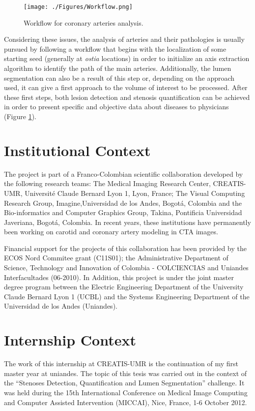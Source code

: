 \begin{figure}[htbp]
	\centering
		\texttt{[image: ./Figures/Workflow.png]}
	\caption[Workflow for coronary arteries analysis.]{Workflow for coronary arteries analysis.}
	\label{fig:Workflow}
\end{figure}

Considering these issues, the analysis of arteries and their pathologies is usually pursued by following a workflow that begins with the localization of some starting seed (generally at \textit{ostia} locations) in order to initialize an axis extraction algorithm to identify the path of the main arteries. Additionally, the lumen segmentation can also be a result of this step or, depending on the approach used, it can give a first approach to the volume of interest to be processed. After these first steps, both lesion detection and stenosis quantification can be achieved in order to present specific and objective data about diseases to physicians (Figure \ref{fig:Workflow}).


\section{Institutional Context}
%
The project is part of a Franco-Colombian scientific collaboration developed by the following research teams: The Medical Imaging Research Center, CREATIS-UMR, Universit\'{e} Claude Bernard Lyon 1, Lyon, France; The Visual Computing Research Group, Imagine,Universidad de los Andes, Bogot\'{a}, Colombia and the Bio-informatics and Computer Graphics Group, Takina, Pontificia Universidad Javeriana, Bogot\'{a}, Colombia. In recent years, these institutions have permanently been working on carotid and coronary artery modeling in CTA images.

Financial support for the projects of this collaboration has been provided by the ECOS Nord Commitee grant (C11S01); the Administrative Department of Science, Technology and Innovation of Colombia - COLCIENCIAS and Uniandes Interfacultades (06-2010). In Addition, this project is under the joint master degree program between the Electric Engineering Department of the University Claude Bernard Lyon 1 (UCBL) and the Systems Engineering Department of the Universidad de los Andes (Uniandes). 

\section{Internship Context}
The work of this internship at CREATIS-UMR is the continuation of my first master year at uniandes. The topic of this tesis was carried out in the context of the ``Stenoses Detection, Quantification and Lumen Segmentation'' challenge. It was held during the 15th International Conference on Medical Image Computing and Computer Assisted Intervention (MICCAI), Nice, France, 1-6 October 2012.
